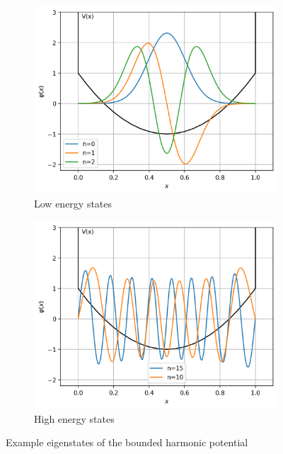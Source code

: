 \documentclass[11pt]{article}
\begin{document}
\vspace{2cm}

\begin{figure}[!h]
  \begin{subfigure}{0.5\textwidth}
    \centering
    \includegraphics[width=\linewidth]{ex_eigenstates2.png}
    \caption{Low energy states}
  \end{subfigure}%
  \begin{subfigure}{0.5\textwidth}
    \centering
    \includegraphics[width=\linewidth]{ex_eigenstates3.png}
    \caption{High energy states}
  \end{subfigure}
  \caption{Example eigenstates of the bounded harmonic potential}
  \label{fig:7}
\end{figure}
\end{document}
